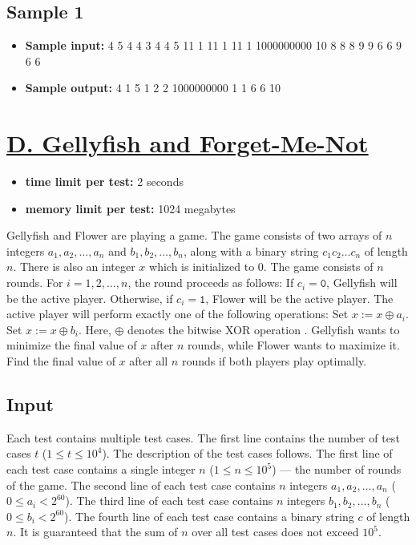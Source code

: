 \documentclass{article}
\begin{document}
\subsection*{Sample 1}
\begin{itemize}
\item \textbf{Sample input:} 
4
5
4 4 3 4 4
5
11 1 11 1 11
1
1000000000
10
8 8 8 9 9 6 6 9 6 6
\item \textbf{Sample output:} 
4 1 5
1 2 2
1000000000 1 1
6 6 10
\end{itemize}
\section{\href{https://codeforces.com/problemset/problem/2115/D}{D. Gellyfish and Forget-Me-Not}}

\begin{itemize}
\item \textbf{time limit per test:} 2 seconds
\item \textbf{memory limit per test:} 1024 megabytes
\end{itemize}
Gellyfish and Flower are playing a game. The game consists of two arrays of $n$ integers $a_1,a_2,\ldots,a_n$ and $b_1,b_2,\ldots,b_n$, along with a binary string $c_1c_2\ldots c_n$ of length $n$. There is also an integer $x$ which is initialized to $0$. The game consists of $n$ rounds. For $i = 1,2,\ldots,n$, the round proceeds as follows: If $c_i = \mathtt{0}$, Gellyfish will be the active player. Otherwise, if $c_i = \mathtt{1}$, Flower will be the active player. The active player will perform exactly one of the following operations: Set $x:=x \oplus a_i$. Set $x:=x \oplus b_i$. Here, $\oplus$ denotes the bitwise XOR operation . Gellyfish wants to minimize the final value of $ x $ after $ n $ rounds, while Flower wants to maximize it. Find the final value of $ x $ after all $ n $ rounds if both players play optimally.

\subsection*{Input}
 Each test contains multiple test cases. The first line contains the number of test cases $t$ ($1 \le t \le 10^4$). The description of the test cases follows. The first line of each test case contains a single integer $n$ ($1 \leq n \leq 10^5$) — the number of rounds of the game. The second line of each test case contains $n$ integers $a_1, a_2, \ldots, a_n$ ($0 \leq a_i < 2^{60}$). The third line of each test case contains $n$ integers $b_1, b_2, \ldots, b_n$ ($0 \leq b_i < 2^{60}$). The fourth line of each test case contains a binary string $c$ of length $n$. It is guaranteed that the sum of $n$ over all test cases does not exceed $10^5$.
\end{document}

